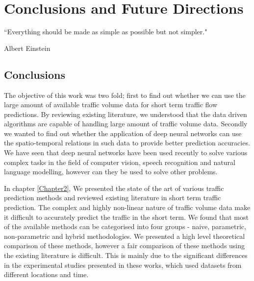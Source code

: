 
\chapter{Conclusions and Future Directions} %

\label{Chapter6} %


``Everything should be made as simple as possible but not simpler."

\begin{flushright}
Albert Einstein
\end{flushright}


\section{Conclusions}

The objective of this work was two fold; first to find out whether we can use the large amount of
available traffic volume data for short term traffic flow predictions. By reviewing existing literature,
we understood that the data driven algorithms are capable of handling large amount of traffic volume
data. Secondly we wanted to find out whether the application of deep neural networks can use the
spatio-temporal relations in such data to provide better prediction accuracies. We have seen that
deep neural networks have been used recently to solve various complex tasks in the field of computer
vision, speech recognition and natural language modelling, however can they be used to solve other problems.

In chapter \ref{Chapter2}, We presented the state of the art of various traffic prediction methods
and reviewed existing literature in short term traffic prediction. The complex and highly non-linear
nature of traffic volume data make it difficult to accurately predict the traffic in the short term.
We found that most of the available methods can be categorised into four groups - naive, parametric,
non-parametric and hybrid methodologies.
We presented a high level theoretical comparison of these methods, however a fair comparison of
these methods using the existing literature is difficult. This is mainly due to the significant
differences in the experimental studies presented in these works, which used datasets from different
locations and time.

